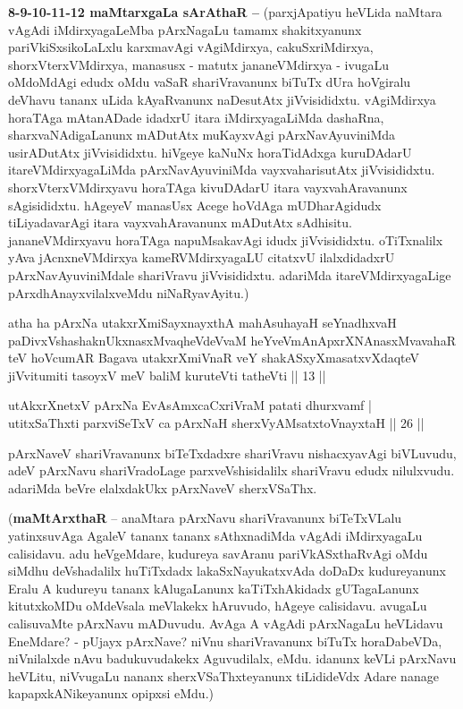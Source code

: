 \begin{artha}
\textbf{8-9-10-11-12 maMtarxgaLa sArAthaR {\rm --}}
(parxjApatiyu heVLida naMtara vAgAdi iMdirxyagaLeMba pArxNagaLu tamamx shakitxyanunx pariVkiSxsikoLaLxlu karxmavAgi vAgiMdirxya, cakuSxriMdirxya, shorxVterxVMdirxya, manasusx - matutx jananeVMdirxya - ivugaLu oMdoMdAgi edudx oMdu vaSaR shariVravanunx biTuTx dUra hoVgiralu deVhavu tananx uLida kAyaRvanunx naDesutAtx jiVvisididxtu. vAgiMdirxya horaTAga mAtanADade idadxrU itara iMdirxyagaLiMda dashaRna, sharxvaNAdigaLanunx mADutAtx muKayxvAgi pArxNavAyuviniMda usirADutAtx jiVvisididxtu. hiVgeye kaNuNx horaTidAdxga kuruDAdarU itareVMdirxyagaLiMda pArxNavAyuviniMda vayxvaharisutAtx jiVvisididxtu. shorxVterxVMdirxyavu horaTAga kivuDAdarU itara vayxvahAravanunx sAgisididxtu. hAgeyeV manasUsx Acege hoVdAga mUDharAgidudx tiLiyadavarAgi itara vayxvahAravanunx mADutAtx sAdhisitu. jananeVMdirxyavu horaTAga napuMsakavAgi idudx jiVvisididxtu. oTiTxnalilx yAva jAcnxneVMdirxya kameRVMdirxyagaLU citatxvU ilalxdidadxrU pArxNavAyuviniMdale shariVravu jiVvisididxtu. adariMda itareVMdirxyagaLige pArxdhAnayxvilalxveMdu niNaRyavAyitu.)
\end{artha}

\begin{shl}
atha ha pArxNa utakxrXmiSayxnayxthA mahAsuhayaH seYnadhxvaH paDivxVshashaknUkxnasxMvaqheVdeVvaM heYveVmAnApxrXNAnasxMvavahaR teV hoVcumAR Bagava utakxrXmiVnaR veY shakASxyXmasatxvXdaqteV jiVvitumiti tasoyxV meV baliM kuruteVti tatheVti || 13 ||
\end{shl}


\begin{shl}
utAkxrXnetxV pArxNa EvAsAmxcaCxriVraM patati dhurxvamf | \\
utitxSaThxti parxviSeTxV ca pArxNaH sherxVyAMsatxtoV\s nayxtaH \hfill|| 26 || 
\end{shl}

\begin{artha}
pArxNaveV shariVravanunx biTeTxdadxre shariVravu nishacxyavAgi 
biVLuvudu, adeV pArxNavu shariVradoLage parxveVshisidalilx shariVravu 
edudx nilulxvudu. adariMda beVre elalxdakUkx pArxNaveV sherxVSaThx.
\end{artha}

\begin{artha}
(\textbf{maMtArxthaR} {\rm --} anaMtara pArxNavu shariVravanunx biTeTxVLalu 
yatinxsuvAga AgaleV tananx tananx sAthxnadiMda vAgAdi iMdirxyagaLu 
calisidavu. adu heVgeMdare, kudureya savAranu pariVkASxthaRvAgi oMdu 
siMdhu deVshadalilx huTiTxdadx lakaSxNayukatxvAda doDaDx kudureyanunx 
Eralu A kudureyu tananx kAlugaLanunx kaTiTxhAkidadx gUTagaLanunx 
kitutxkoMDu oMdeVsala meVlakekx hAruvudo, hAgeye calisidavu. avugaLu 
calisuvaMte pArxNavu mADuvudu. AvAga A vAgAdi pArxNagaLu heVLidavu 
EneMdare? - pUjayx pArxNave? niVnu shariVravanunx biTuTx horaDabeVDa, 
niVnilalxde nAvu badukuvudakekx Aguvudilalx, eMdu. idanunx keVLi 
pArxNavu heVLitu, niVvugaLu nananx sherxVSaThxteyanunx tiLidideVdx 
Adare nanage kapapxkANikeyanunx opipxsi eMdu.)
\end{artha}

